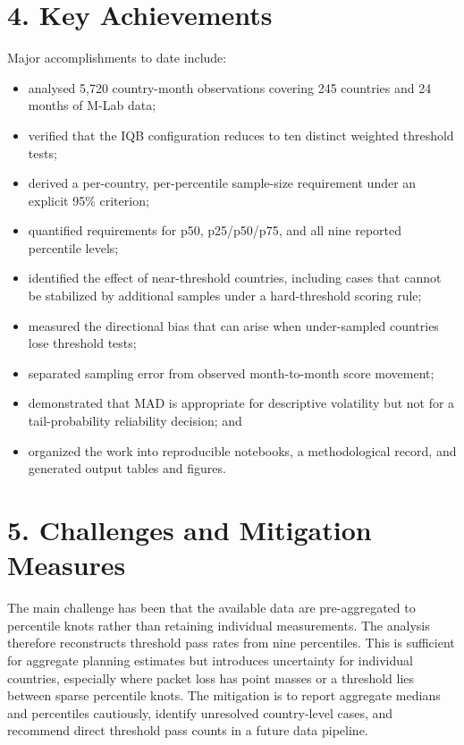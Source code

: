 \documentclass[11pt]{article}
\begin{document}
\section*{4. Key Achievements}

Major accomplishments to date include:
\begin{itemize}
  \item analysed 5,720 country-month observations covering 245 countries and 24 months of M-Lab data;
  \item verified that the IQB configuration reduces to ten distinct weighted threshold tests;
  \item derived a per-country, per-percentile sample-size requirement under an explicit 95\% criterion;
  \item quantified requirements for p50, p25/p50/p75, and all nine reported percentile levels;
  \item identified the effect of near-threshold countries, including cases that cannot be stabilized by
  additional samples under a hard-threshold scoring rule;
  \item measured the directional bias that can arise when under-sampled countries lose threshold tests;
  \item separated sampling error from observed month-to-month score movement;
  \item demonstrated that MAD is appropriate for descriptive volatility but not for a tail-probability
  reliability decision; and
  \item organized the work into reproducible notebooks, a methodological record, and generated output
  tables and figures.
\end{itemize}

\section*{5. Challenges and Mitigation Measures}

The main challenge has been that the available data are pre-aggregated to percentile knots rather than
retaining individual measurements. The analysis therefore reconstructs threshold pass rates from nine
percentiles. This is sufficient for aggregate planning estimates but introduces uncertainty for
individual countries, especially where packet loss has point masses or a threshold lies between sparse
percentile knots. The mitigation is to report aggregate medians and percentiles cautiously, identify
unresolved country-level cases, and recommend direct threshold pass counts in a future data pipeline.
\end{document}
